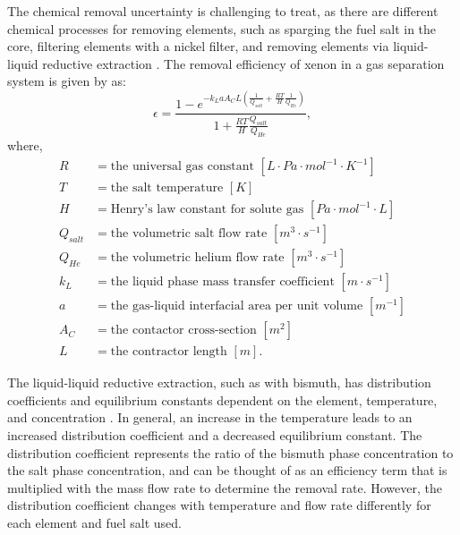 The chemical removal uncertainty is challenging to treat, as there are different chemical processes for removing elements, such as sparging the fuel salt in the core, filtering elements with a nickel filter, and removing elements via liquid-liquid reductive extraction \cite{rykhlevskii2020fuel}.
The removal efficiency of xenon in a gas separation system is given by \cite{peebles1968removal, rykhlevskii2020fuel} as:
\begin{equation}
    \epsilon = \frac{1-e^{-k_LaA_CL \left(\frac{1}{Q_{salt}}+\frac{RT}{H} \frac{1}{Q_{He}} \right) }}{1+\frac{RT}{H} \frac{Q_{salt}}{Q_{He}}},
    \label{eq:xe-eff}
\end{equation}
where,
\begin{align}
    R &= \text{the universal gas constant $[L \cdot Pa \cdot mol^{-1} \cdot K^{-1}]$} \nonumber \\
    T &= \text{the salt temperature $[K]$} \nonumber \\
    H &= \text{Henry's law constant for solute gas $[Pa \cdot mol^{-1} \cdot L]$} \nonumber \\
    Q_{salt} &= \text{the volumetric salt flow rate $[m^{3} \cdot s^{-1}]$} \nonumber \\
    Q_{He} &= \text{the volumetric helium flow rate $[m^{3} \cdot s^{-1}]$} \nonumber \\
    k_L &= \text{the liquid phase mass transfer coefficient $[m \cdot s^{-1}]$} \nonumber \\
    a &= \text{the gas-liquid interfacial area per unit volume $[m^{-1}]$} \nonumber \\
    A_C &= \text{the contactor cross-section $[m^{2}]$ } \nonumber \\
    L &= \text{the contractor length $[m]$.} \nonumber
\end{align}

The liquid-liquid reductive extraction, such as with bismuth, has distribution coefficients and equilibrium constants dependent on the element, temperature, and concentration \cite{moriyama1984reductive}.
In general, an increase in the temperature leads to an increased distribution coefficient and a decreased equilibrium constant.
The distribution coefficient represents the ratio of the bismuth phase concentration to the salt phase concentration, and can be thought of as an efficiency term that is multiplied with the mass flow rate to determine the removal rate.
However, the distribution coefficient changes with temperature and flow rate differently for each element and fuel salt used.

